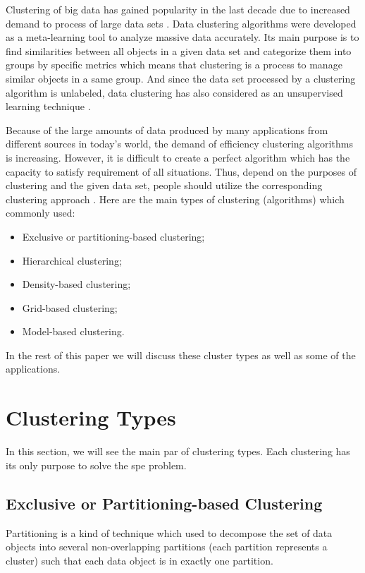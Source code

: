 \documentclass[sigconf]{acmart}
\begin{document}
Clustering of big data has gained popularity in the last decade due to increased demand to process of large data sets \cite{bcab}. Data clustering algorithms were developed as a meta-learning tool to analyze massive data accurately. Its main purpose is to find similarities between all objects in a given data set and categorize them into groups by specific metrics which means that clustering is a process to manage similar objects in a same group. And since the data set processed by a clustering algorithm is unlabeled, data clustering has also considered as an unsupervised learning technique \cite{dcaa}.

Because of the large amounts of data produced by many applications from different sources in today's world, the demand of efficiency clustering algorithms is increasing. However, it is difficult to create a perfect algorithm which has the capacity to satisfy requirement of all situations. Thus, depend on the purposes of clustering and the given data set, people should utilize the corresponding clustering approach \cite{bcab}. Here are the main types of clustering (algorithms) which commonly used:
\begin{itemize}
\item Exclusive or partitioning-based clustering;
\item Hierarchical clustering;
\item Density-based clustering;
\item Grid-based clustering;
\item Model-based clustering.
\end{itemize}
In the rest of this paper we will discuss these cluster types as well as some of the applications.

\section{Clustering Types}
In this section, we will see the main par of clustering types. Each clustering has its only purpose to solve the spe problem.
\subsection{Exclusive or Partitioning-based Clustering}

Partitioning is a kind of technique which used to decompose the set of data objects into several non-overlapping partitions (each partition represents a cluster) such that each data object is in exactly one partition.
\end{document}
